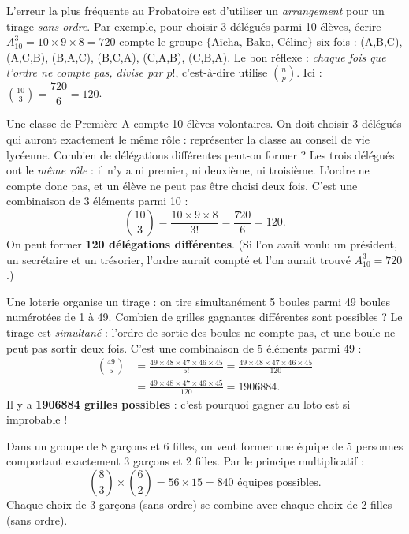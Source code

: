 \documentclass[11pt]{article}
\begin{document}
\begin{attention}
L'erreur la plus fréquente au Probatoire est d'utiliser un \emph{arrangement} pour un tirage \emph{sans ordre}. Par exemple, pour choisir 3 délégués parmi 10 élèves, écrire $A_{10}^3 = 10\times 9\times 8 = 720$ compte le groupe $\{\text{Aïcha, Bako, Céline}\}$ six fois : (A,B,C), (A,C,B), (B,A,C), (B,C,A), (C,A,B), (C,B,A). Le bon réflexe : \emph{chaque fois que l'ordre ne compte pas, divise par $p!$}, c'est-à-dire utilise $\binom{n}{p}$. Ici : $\binom{10}{3} = \dfrac{720}{6} = 120$.
\end{attention}

\begin{exoresolu}
Une classe de Première A compte 10 élèves volontaires. On doit choisir 3 délégués qui auront exactement le même rôle : représenter la classe au conseil de vie lycéenne. Combien de délégations différentes peut-on former ?
\tcblower
Les trois délégués ont le \emph{même rôle} : il n'y a ni premier, ni deuxième, ni troisième. L'ordre ne compte donc pas, et un élève ne peut pas être choisi deux fois. C'est une combinaison de 3 éléments parmi 10 :
\[ \binom{10}{3} = \frac{10\times 9\times 8}{3!} = \frac{720}{6} = 120. \]
On peut former \textbf{120 délégations différentes}. (Si l'on avait voulu un président, un secrétaire et un trésorier, l'ordre aurait compté et l'on aurait trouvé $A_{10}^3 = 720$.)
\end{exoresolu}

\begin{exoresolu}
Une loterie organise un tirage : on tire simultanément 5 boules parmi 49 boules numérotées de 1 à 49. Combien de grilles gagnantes différentes sont possibles ?
\tcblower
Le tirage est \emph{simultané} : l'ordre de sortie des boules ne compte pas, et une boule ne peut pas sortir deux fois. C'est une combinaison de 5 éléments parmi 49 :
\begin{align*}
\binom{49}{5} &= \frac{49\times 48\times 47\times 46\times 45}{5!} = \frac{49\times 48\times 47\times 46\times 45}{120} \\
&= \frac{49\times 48\times 47\times 46\times 45}{120} = \num{1906884}.
\end{align*}
Il y a \textbf{\num{1906884} grilles possibles} : c'est pourquoi gagner au loto est si improbable !
\end{exoresolu}

\begin{exemplebox}
Dans un groupe de 8 garçons et 6 filles, on veut former une équipe de 5 personnes comportant exactement 3 garçons et 2 filles. Par le principe multiplicatif :
\[ \binom{8}{3}\times\binom{6}{2} = 56\times 15 = 840 \text{ équipes possibles.} \]
Chaque choix de 3 garçons (sans ordre) se combine avec chaque choix de 2 filles (sans ordre).
\end{exemplebox}
\end{document}
